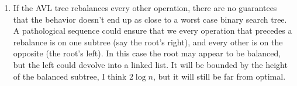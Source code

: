 \documentclass[12pt]{chmullighw}
\begin{document}
\begin{enumerate}
\item If the AVL tree rebalances every other operation, there are no guarantees that the behavior doesn't end up as close to a worst case binary search tree. A pathological sequence could ensure that we every operation that precedes a rebalance is on one subtree (say the root's right), and every other is on the opposite (the root's left). In this case the root may appear to be balanced, but the left could devolve into a linked list. It will be bounded by the height of the balanced subtree, I think $2 \log n$, but it will still be far from optimal.

\end{enumerate} %
\end{document}
